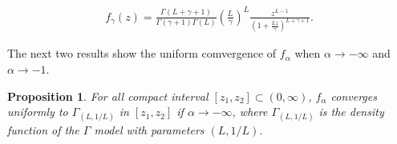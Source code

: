 \documentclass[journal]{IEEEtran}
\newtheorem{proposition}{Proposition}
\numberwithin{equation}{section}
\newcommand{\pa}[1]{\ensuremath{\left( #1 \right)}}
\begin{document}
\begin{align}
f_{\gamma}(z)=\frac{\Gamma\pa{L+\gamma+1}}{\Gamma\pa{\gamma+1}\Gamma\pa{L}}
\pa{\frac{L}{\gamma}}^L \frac{z^{L-1}}{\pa{1+\frac{Lz}{\gamma}}^{L+\gamma+1}}.
\label{fgamma}
\end{align}




The next two results show the uniform comvergence of $f_\alpha$ when $\alpha \to -\infty$ and $\alpha \to -1$.



\begin{proposition}
	For all compact interval $[z_{1},z_{2}]\subset\pa{0,\infty}$, $f_{\alpha}$ converges uniformly to $\Gamma_{(L,1/L)}$ in $[z_{1},z_{2}]$ if $\alpha\to -\infty$,
	where $\Gamma_{(L,1/L)}$ is the density function of the $\Gamma$ model with parameters $\pa{L,1/L}$.
	\label{pr: convergenciauniforme1}
\end{proposition}
\end{document}
